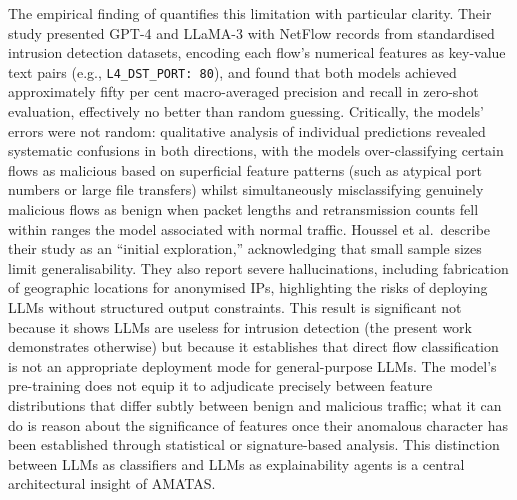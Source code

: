 \documentclass[../main.tex]{subfiles}
\begin{document}
The empirical finding of \textcite{Houssel2024} quantifies this limitation with particular clarity. Their study presented GPT-4 and LLaMA-3 with NetFlow records from standardised intrusion detection datasets, encoding each flow's numerical features as key-value text pairs (e.g., \texttt{L4\_DST\_PORT: 80}), and found that both models achieved approximately fifty per cent macro-averaged precision and recall in zero-shot evaluation, effectively no better than random guessing. Critically, the models' errors were not random: qualitative analysis of individual predictions revealed systematic confusions in both directions, with the models over-classifying certain flows as malicious based on superficial feature patterns (such as atypical port numbers or large file transfers) whilst simultaneously misclassifying genuinely malicious flows as benign when packet lengths and retransmission counts fell within ranges the model associated with normal traffic. Houssel et al.\ describe their study as an ``initial exploration,'' acknowledging that small sample sizes limit generalisability. They also report severe hallucinations, including fabrication of geographic locations for anonymised IPs, highlighting the risks of deploying LLMs without structured output constraints. This result is significant not because it shows LLMs are useless for intrusion detection (the present work demonstrates otherwise) but because it establishes that direct flow classification is not an appropriate deployment mode for general-purpose LLMs. The model's pre-training does not equip it to adjudicate precisely between feature distributions that differ subtly between benign and malicious traffic; what it can do is reason about the significance of features once their anomalous character has been established through statistical or signature-based analysis. This distinction between LLMs as classifiers and LLMs as explainability agents is a central architectural insight of AMATAS.
\end{document}
